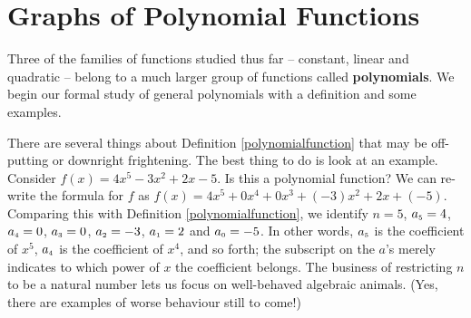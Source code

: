 \section{Graphs of Polynomial Functions}
\label{GraphsofPolynomials}

Three of the families of functions studied thus far -- constant, linear and  quadratic -- belong to a much larger group of functions called \textbf{polynomials}.  We begin our formal study of general polynomials with a definition and some examples.

\smallskip


\medskip

There are several things about Definition \ref{polynomialfunction} that may be off-putting or downright frightening.  The best thing to do is look at an example.  Consider $f(x) = 4x^5 - 3x^2 + 2x - 5$.  Is this a polynomial function?  We can re-write the formula for $f$ as $f(x)= 4x^5 + 0 x^{4} + 0 x^{3} + (-3)x^2 + 2 x + (-5).$  Comparing this with Definition \ref{polynomialfunction}, we identify $n=5$, $a_{\mbox{\tiny $5$}} = 4$, $a_{\mbox{\tiny $4$}} = 0$, $a_{\mbox{\tiny $3$}} = 0$, $a_{\mbox{\tiny $2$}} = -3$, $a_{\mbox{\tiny $1$}} = 2$ and $a_{\mbox{\tiny $0$}} = -5$.  In other words, $a_{\mbox{\tiny $5$}}$ is the coefficient of $x^{5}$, $a_{\mbox{\tiny $4$}}$ is the coefficient of $x^{4}$, and so forth;  the subscript on the $a$'s merely indicates to which power of $x$ the coefficient belongs.  The business of restricting $n$ to be a natural number lets us focus on well-behaved algebraic animals. (Yes, there are examples of worse behaviour still to come!)


\medskip

